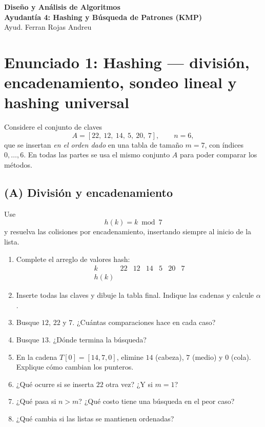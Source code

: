 \documentclass[11pt]{article}
\newcommand{\coursetitle}{Diseño y Análisis de Algoritmos}
\newcommand{\lecturenumber}{4}
\newcommand{\lecturetitle}{Hashing y Búsqueda de Patrones (KMP)}
\newcommand{\instructor}{Ayud. Ferran Rojas Andreu}
\begin{document}
\begin{center}
  {\Large \textbf{\coursetitle}}\\[0.25em]
  {\large \textbf{Ayudantía \lecturenumber: \lecturetitle}}\\[0.25em]
  {\small \instructor}
\end{center}

\section*{Enunciado 1: Hashing --- división, encadenamiento, sondeo lineal y hashing universal}

Considere el conjunto de claves
\[
A=[22,\ 12,\ 14,\ 5,\ 20,\ 7], \qquad n=6,
\]
que se insertan \emph{en el orden dado} en una tabla de tamaño \(m=7\), con índices \(0,\dots,6\). En todas las partes se usa el mismo conjunto \(A\) para poder comparar los métodos.

\subsection*{(A) División y encadenamiento}

Use
\[
h(k)=k\bmod 7
\]
y resuelva las colisiones por encadenamiento, insertando siempre al inicio de la lista.

\begin{enumerate}[label=(\alph*),itemsep=0.25em]
\item Complete el arreglo de valores hash:
\[
\begin{array}{c|cccccc}
k & 22 & 12 & 14 & 5 & 20 & 7\\ \hline
h(k) & & & & & &
\end{array}
\]
\item Inserte todas las claves y dibuje la tabla final. Indique las cadenas y calcule \(\alpha\).
\item Busque \(12\), \(22\) y \(7\). ¿Cuántas comparaciones hace en cada caso?
\item Busque \(13\). ¿Dónde termina la búsqueda?
\item En la cadena \(T[0]=[14,7,0]\), elimine \(14\) (cabeza), \(7\) (medio) y \(0\) (cola). Explique cómo cambian los punteros.
\item ¿Qué ocurre si se inserta \(22\) otra vez? ¿Y si \(m=1\)?
\item ¿Qué pasa si \(n>m\)? ¿Qué costo tiene una búsqueda en el peor caso?
\item ¿Qué cambia si las listas se mantienen ordenadas?
\end{enumerate}
\end{document}
